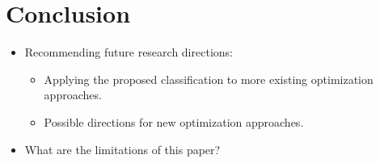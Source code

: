 \newpage
\section{Conclusion}
\label{ch:Conclusion}

\begin{itemize}
    \item Recommending future research directions: \begin{itemize}
        \item Applying the proposed classification to more existing optimization approaches.
        \item Possible directions for new optimization approaches.
    \end{itemize}
    \item What are the limitations of this paper?
\end{itemize}